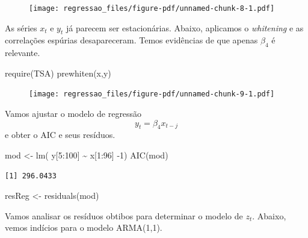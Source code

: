 \documentclass[
  letterpaper,
  DIV=11,
  numbers=noendperiod]{scrartcl}
\newenvironment{Shaded}{\begin{snugshade}}{\end{snugshade}}
\newcommand{\DecValTok}[1]{\textcolor[rgb]{0.68,0.00,0.00}{#1}}
\newcommand{\FunctionTok}[1]{\textcolor[rgb]{0.28,0.35,0.67}{#1}}
\newcommand{\NormalTok}[1]{\textcolor[rgb]{0.00,0.23,0.31}{#1}}
\newcommand{\OtherTok}[1]{\textcolor[rgb]{0.00,0.23,0.31}{#1}}
\newcommand{\SpecialCharTok}[1]{\textcolor[rgb]{0.37,0.37,0.37}{#1}}
\theoremstyle{plain}
\theoremstyle{plain}
\theoremstyle{definition}
\theoremstyle{definition}
\theoremstyle{remark}
\begin{document}
\begin{figure}[H]

{\centering \texttt{[image: regressao\_files/figure-pdf/unnamed-chunk-8-1.pdf]}

}

\end{figure}

As séries \(x_t\) e \(y_t\) já parecem ser estacionárias. Abaixo,
aplicamos o \emph{whitening} e as correlações espúrias desapareceram.
Temos evidências de que apenas \(\beta_{4}\) é relevante.

\begin{Shaded}
\begin{Highlighting}[]
\FunctionTok{require}\NormalTok{(TSA)}
\FunctionTok{prewhiten}\NormalTok{(x,y)}
\end{Highlighting}
\end{Shaded}

\begin{figure}[H]

{\centering \texttt{[image: regressao\_files/figure-pdf/unnamed-chunk-9-1.pdf]}

}

\end{figure}

Vamos ajustar o modelo de regressão \[y_t=\beta_{4}x_{t-j}\] e obter o
AIC e seus resíduos.

\begin{Shaded}
\begin{Highlighting}[]
\NormalTok{mod }\OtherTok{\textless{}{-}} \FunctionTok{lm}\NormalTok{( y[}\DecValTok{5}\SpecialCharTok{:}\DecValTok{100}\NormalTok{] }\SpecialCharTok{\textasciitilde{}}\NormalTok{ x[}\DecValTok{1}\SpecialCharTok{:}\DecValTok{96}\NormalTok{] }\SpecialCharTok{{-}}\DecValTok{1}\NormalTok{)}
\FunctionTok{AIC}\NormalTok{(mod)}
\end{Highlighting}
\end{Shaded}

\begin{verbatim}
[1] 296.0433
\end{verbatim}

\begin{Shaded}
\begin{Highlighting}[]
\NormalTok{resReg }\OtherTok{\textless{}{-}} \FunctionTok{residuals}\NormalTok{(mod)}
\end{Highlighting}
\end{Shaded}

Vamos analisar os resíduos obtibos para determinar o modelo de \(z_t\).
Abaixo, vemos indícios para o modelo ARMA(1,1).
\end{document}
